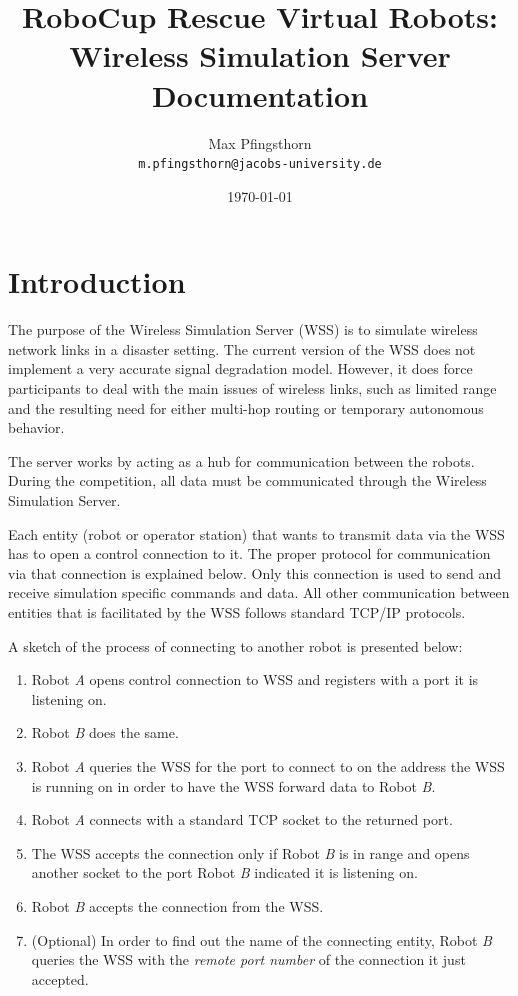 \documentclass[11pt,a4paper]{article}
\title{RoboCup Rescue Virtual Robots:\\Wireless Simulation Server Documentation}
\author{Max Pfingsthorn\\\texttt{\small m.pfingsthorn@jacobs-university.de}}
\date{\today}
\begin{document}

\maketitle

\section{Introduction}

The purpose of the Wireless Simulation Server (WSS) is to simulate wireless network links in a disaster setting. The current version of the WSS does not implement a very accurate signal degradation model. However, it does force participants to deal with the main issues of wireless links, such as limited range and the resulting need for either multi-hop routing or temporary autonomous behavior.

The server works by acting as a hub for communication between the robots. During the competition, all data must be communicated through the Wireless Simulation Server.

Each entity (robot or operator station) that wants to transmit data via the WSS has to open a control connection to it. The proper protocol for communication via that connection is explained below. Only this connection is used to send and receive simulation specific commands and data. All other communication between entities that is facilitated by the WSS follows standard TCP/IP protocols.

A sketch of the process of connecting to another robot is presented below:
\begin{enumerate}
	\item Robot \emph{A} opens control connection to WSS and registers with a port it is listening on.
	\item Robot \emph{B} does the same.
	\item Robot \emph{A} queries the WSS for the port to connect to on the address the WSS is running on in order to have the WSS forward data to Robot \emph{B}.
	\item Robot \emph{A} connects with a standard TCP socket to the returned port.
	\item The WSS accepts the connection only if Robot \emph{B} is in range and opens another socket to the port Robot \emph{B} indicated it is listening on.
	\item Robot \emph{B} accepts the connection from the WSS.
	\item (Optional) In order to find out the name of the connecting entity, Robot \emph{B} queries the WSS with the \emph{remote port number} of the connection it just accepted.
\end{enumerate}
\end{document}
